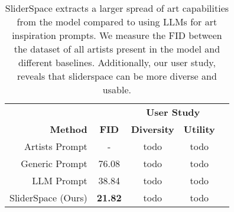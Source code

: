 \begin{table}
    \centering
    \begin{tabular}{rcccc}
        & & \multicolumn{2}{c}{\textbf{User Study}} \\
        \textbf{Method} & \textbf{FID} & \textbf{Diversity}  & \textbf{Utility} \\
        \hline
        Artists Prompt &  - & todo & todo \\
        Generic Prompt & 76.08 & todo & todo \\

        LLM Prompt & 38.84 & todo & todo \\

        SliderSpace (Ours) & \textbf{21.82}& todo& todo \\

    \end{tabular}
    \caption{SliderSpace extracts a larger spread of art capabilities from the model compared to using LLMs for art inspiration prompts. We measure the FID between the dataset of all artists present in the model and different baselines. Additionally, our user study, reveals that sliderspace can be more diverse and usable. }
    \label{tab:artfid}
\end{table}